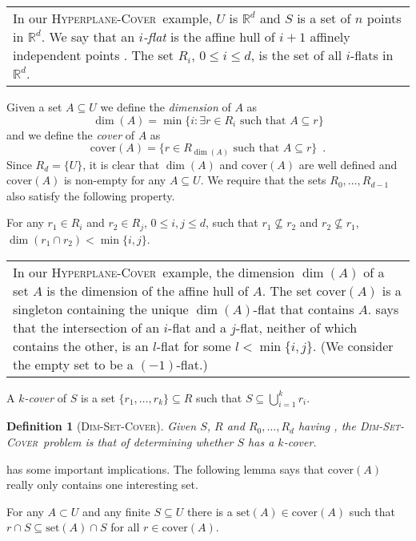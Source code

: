 \documentclass[ccfonts,lotsofwhite]{patmorin}
\newtheorem{defn}{Definition}
\newcommand{\hppc}{\textsc{Hyperplane-Cover}}
\newcommand{\cover}{\mathrm{cover}}
\newcommand{\set}{\mathrm{set}}
\newcommand{\setcover}{\textsc{Dim-Set-Cover}}
\newenvironment{example}{%
	\addtolength{\textwidth}{-1cm}
	\begin{center}\begin{tabular}{|p{\textwidth}|}}
	{\end{tabular}\end{center}}
\begin{document}
\begin{example}
In our \hppc\ example, $U$ is $\mathbb{R}^d$ and $S$ is a set of $n$
points in $\mathbb{R}^d$.  We say that an \emph{$i$-flat} is the
affine hull of $i+1$ affinely independent points \cite{ps85}.  The set
$R_i$, $0\le i\le d$, is the set of all $i$-flats in $\mathbb{R}^d$. 
\end{example}


Given a set $A\subseteq U$ we define the \emph{dimension} of $A$ as
\[
\dim(A) = \min\{i:\exists r\in R_i\mbox{ such that } A\subseteq r\}
\]
and we define the \emph{cover} of $A$ as 
\[
\cover(A) = \{r\in R_{\dim(A)}\mbox{ such that } A\subseteq r\} \enspace .
\]
Since $R_{d}=\{U\}$, it is clear that $\dim(A)$ and $\cover(A)$ are
well defined and $\cover(A)$ is non-empty for any $A\subseteq U$.  We
require that the sets $R_0,\ldots,R_{d-1}$ also satisfy the following
property.

\begin{prop}
For any $r_1\in R_i$ and $r_2\in R_j$, $0\le i,j\le d$, such that
$r_1\not\subseteq r_2$ and $r_2\not\subseteq r_1$, $\dim(r_1\cap r_2)<
\min\{i,j\}$.
\end{prop}

\begin{example}
In our \hppc\ example, the dimension $\dim(A)$ of a set $A$ is the
dimension of the affine hull of $A$.  The set $\cover(A)$ is a
singleton containing the unique $\dim(A)$-flat that contains $A$.
\propref{intersection} says that the intersection of an $i$-flat and a
$j$-flat, neither of which contains the other, is an $l$-flat for some
$l<\min\{i,j\}$. (We consider the empty set to be a $(-1)$-flat.)
\end{example}

A \emph{$k$-cover} of $S$ is a set $\{r_1,\ldots,r_k\}\subseteq R$
such that $S\subseteq \bigcup_{i=1}^k r_i$.  

\begin{defn}[\setcover]
Given $S$, $R$ and $R_0,\ldots,R_d$ having , 
the \setcover\ problem is that of
determining whether $S$ has a $k$-cover.  
\end{defn}

 has some important implications.  The following
lemma says that $\cover(A)$ really only contains one interesting set.

\begin{lem}
For any $A\subset U$ and any finite $S\subseteq U$ there is a
$\set(A)\in\cover(A)$ such that $r\cap S\subseteq \set(A)\cap S$ for
all $r\in\cover(A)$.
\end{lem}
\end{document}
